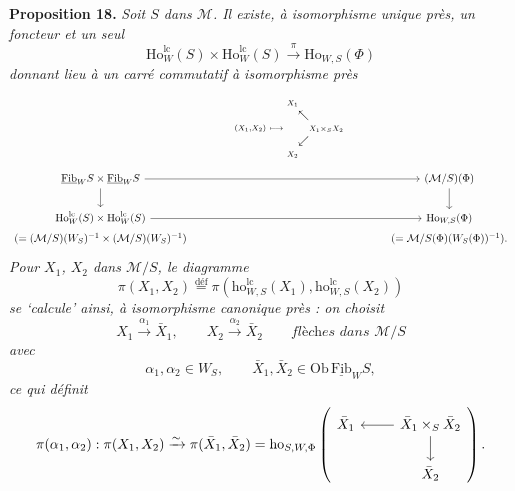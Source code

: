 \documentclass[11pt]{article}
\newcommand{\Fibu}{\underline{\mathrm{Fib}}}
\newcommand{\Ho}{\mathrm{Ho}}
\newcommand{\ho}{\mathrm{ho}}
\newcommand{\lc}{\mathrm{lc}}
\begin{document}
\textbf{Proposition 18.} \textit{Soit $S$ dans $\mathcal{M}$. Il existe, à isomorphisme unique près, un foncteur et un seul}
\[
\Ho^{\lc}_W(S) \times \Ho^{\lc}_W(S) \xrightarrow{\pi} \Ho_{W,S}(\Phi)
\]
\textit{donnant lieu à un carré commutatif à isomorphisme près}
\[
\begin{tikzcd}[ampersand replacement=\&, column sep=large]
 \& {\scriptstyle (X_1,X_2)\ \longmapsto\ \begin{array}{@{}c@{}c@{}c@{}} \scriptstyle X_1 & & \\ & \nwarrow & \\ & & \scriptstyle X_1 \times_S X_2 \\ & \swarrow & \\ \scriptstyle X_2 & & \end{array}} \& \\[-3ex]
\Fibu_W S \times \Fibu_W S \arrow[rr] \arrow[d] \& \& (\mathcal{M}/S)(\Phi) \arrow[d] \\
\Ho^{\lc}_W(S) \times \Ho^{\lc}_W(S) \arrow[rr] \& \& \Ho_{W,S}(\Phi) \\[-4ex]
(= (\mathcal{M}/S)(W_S)^{-1} \times (\mathcal{M}/S)(W_S)^{-1}) \& \& (= \mathcal{M}/S(\Phi)(W_S(\Phi))^{-1}).
\end{tikzcd}
\]
\textit{Pour $X_1$, $X_2$ dans $\mathcal{M}/S$, le diagramme}
\[
\pi(X_1, X_2) \overset{\text{déf}}{=} \pi(\ho^{\lc}_{W,S}(X_1), \ho^{\lc}_{W,S}(X_2))
\]
\textit{se `calcule' ainsi, à isomorphisme canonique près : on choisit}
\[
X_1 \xrightarrow{\alpha_1} \bar{X}_1, \qquad X_2 \xrightarrow{\alpha_2} \bar{X}_2 \qquad \textit{flèches dans } \mathcal{M}/S
\]
\textit{avec}
\[
\alpha_1, \alpha_2 \in W_S, \qquad \bar{X}_1, \bar{X}_2 \in \mathrm{Ob}\, \Fibu_W S,
\]
\textit{ce qui définit}
\[
\pi(\alpha_1, \alpha_2) : \pi(X_1, X_2) \xrightarrow{\sim} \pi(\bar{X}_1, \bar{X}_2) = \ho_{S,W,\Phi}
\left(
\begin{tikzcd}[ampersand replacement=\&]
\bar{X}_1 \& \bar{X}_1 \times_S \bar{X}_2 \arrow[l] \arrow[d] \\
 \& \bar{X}_2
\end{tikzcd}
\right).
\]
\end{document}
